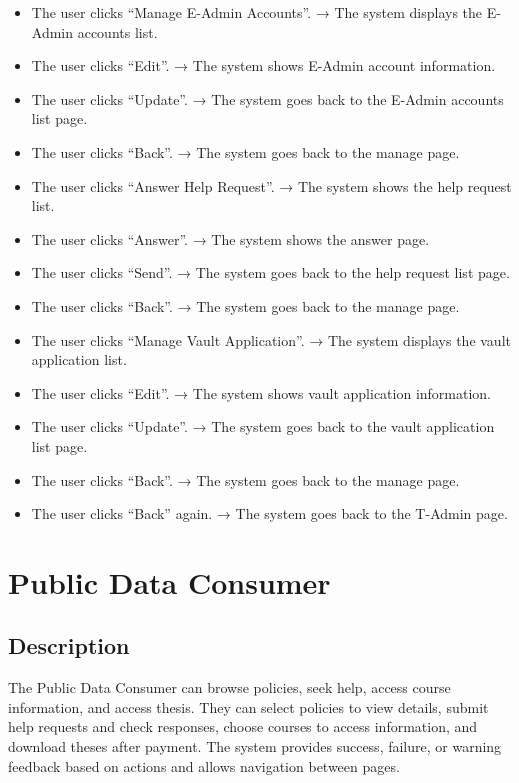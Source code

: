 \begin{itemize}
    \item The user clicks “Manage E-Admin Accounts”. → The system displays the E-Admin accounts list.
    \item The user clicks “Edit”. → The system shows E-Admin account information.
    \item The user clicks “Update”. → The system goes back to the E-Admin accounts list page.
    \item The user clicks “Back”. → The system goes back to the manage page.
    
    \item The user clicks “Answer Help Request”. → The system shows the help request list.
    \item The user clicks “Answer”. → The system shows the answer page.
    \item The user clicks “Send”. → The system goes back to the help request list page.
    \item The user clicks “Back”. → The system goes back to the manage page.
    
    \item The user clicks “Manage Vault Application”. → The system displays the vault application list.
    \item The user clicks “Edit”. → The system shows vault application information.
    \item The user clicks “Update”. → The system goes back to the vault application list page.
    \item The user clicks “Back”. → The system goes back to the manage page.
    \item The user clicks “Back” again. → The system goes back to the T-Admin page.
\end{itemize}

\section{Public Data Consumer}

\subsection{Description}
The Public Data Consumer can browse policies, seek help, access course information, and access thesis. They can select policies to view details, submit help requests and check responses, choose courses to access information, and download theses after payment. The system provides success, failure, or warning feedback based on actions and allows navigation between pages.

